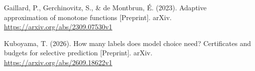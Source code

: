 Gaillard, P., Gerchinovitz, S., \& de Montbrun, {\'E}. (2023).
Adaptive approximation of monotone functions [Preprint].
arXiv. \url{https://arxiv.org/abs/2309.07530v1}

Kuboyama, T. (2026).
How many labels does model choice need? Certificates and budgets for selective
prediction [Preprint].
arXiv. \url{https://arxiv.org/abs/2609.18622v1}
